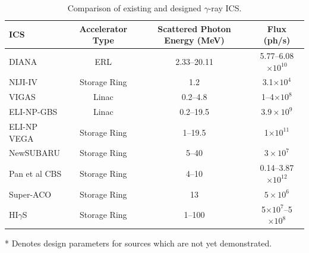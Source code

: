 \documentclass[../main.tex]{subfiles}
\begin{document}
\begin{table}[!h]
\caption{Comparison of existing and designed $\gamma$-ray ICS.}
\begin{threeparttable}
\begin{tabular}{lccc}
\hline\hline
ICS & Accelerator Type & Scattered Photon Energy (\si{\mega\electronvolt}) & Flux (ph/\si{\second}) \\
\hline
DIANA\tnote{*} & ERL & 2.33--20.11 & 5.77--6.08$\times 10^{10}$ \\ 
NIJI-IV \cite{sei2017demonstration} & Storage Ring & 1.2 & 3.1$\times 10^{4}$ \\
VIGAS\tnote{*} \cite{shi2021vigas,brenner2020summary} & Linac & 0.2--4.8 & 1--4$\times 10^{8}$ \\
ELI-NP-GBS\tnote{*} \cite{adriani2014technical} & Linac & 0.2--19.5 & $3.9\times 10^{9}$ \\
ELI-NP VEGA\tnote{*} \cite{tanaka2020current,elinp2019vega} & Storage Ring & 1--19.5 & 1$\times 10^{11}$\\
NewSUBARU \cite{utsunomiya2015gamma} & Storage Ring & 5--40 & $3\times 10^{7}$ \\
Pan et al CBS\tnote{*} \cite{pan2019design} & Storage Ring & 4--10 & 0.14--3.87$\times 10^{12}$ \\ 
Super-ACO \cite{nutarelli1998gamma} & Storage Ring & 13 & $5\times10^{6}$ \\
HI$\gamma$S \cite{weller2009research} & Storage Ring & 1--100 & 5$\times 10^{7}$--5$\times 10^{8}$ \\
\hline\hline
\end{tabular}
\begin{tablenotes}
\item[*]{Denotes design parameters for sources which are not yet demonstrated.}
\end{tablenotes}
\end{threeparttable}
\label{tab:gammaray_ICS_comparison}
\end{table}
\end{document}
